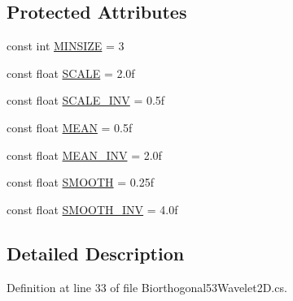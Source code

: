 \subsection*{\-Protected \-Attributes}
\begin{DoxyCompactItemize}
\item 
const int \hyperlink{class_turbo_wavelets_1_1_biorthogonal53_wavelet2_d_aa6981c16a1765d4664747274676d5eba}{\-M\-I\-N\-S\-I\-Z\-E} = 3
\item 
const float \hyperlink{class_turbo_wavelets_1_1_biorthogonal53_wavelet2_d_af0ccd844200200f57839dea6823daaa6}{\-S\-C\-A\-L\-E} = 2.\-0f
\item 
const float \hyperlink{class_turbo_wavelets_1_1_biorthogonal53_wavelet2_d_a035bc7a8559c9e4eb476c6a1c1d8cc9a}{\-S\-C\-A\-L\-E\-\_\-\-I\-N\-V} = 0.\-5f
\item 
const float \hyperlink{class_turbo_wavelets_1_1_biorthogonal53_wavelet2_d_ab01bdb5e655a9f02b6ed6337ad88e4e4}{\-M\-E\-A\-N} = 0.\-5f
\item 
const float \hyperlink{class_turbo_wavelets_1_1_biorthogonal53_wavelet2_d_a087508fa3e1f6e94477310a061d09784}{\-M\-E\-A\-N\-\_\-\-I\-N\-V} = 2.\-0f
\item 
const float \hyperlink{class_turbo_wavelets_1_1_biorthogonal53_wavelet2_d_ac608d0d31583d5c06c6dd7ab41880cb6}{\-S\-M\-O\-O\-T\-H} = 0.\-25f
\item 
const float \hyperlink{class_turbo_wavelets_1_1_biorthogonal53_wavelet2_d_aeb90da1672a5e2fd88863bf227ee6db9}{\-S\-M\-O\-O\-T\-H\-\_\-\-I\-N\-V} = 4.\-0f
\end{DoxyCompactItemize}


\subsection{\-Detailed \-Description}


\-Definition at line 33 of file \-Biorthogonal53\-Wavelet2\-D.\-cs.



